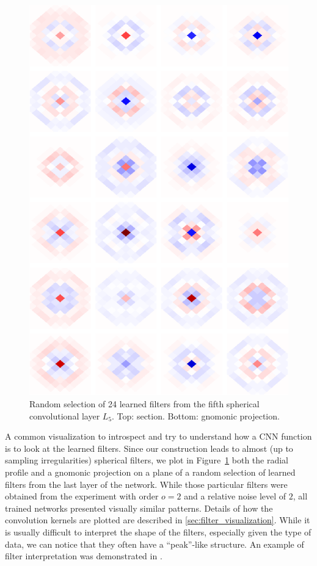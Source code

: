 \documentclass[final,twocolumn,3p,times,sort&compress]{elsarticle}
\newcommand{\figref}[1]{Figure~\ref{fig:#1}}
\newcommand{\1}{\b{1}}              %
\newcommand{\0}{\b{0}}              %
\begin{document}
\begin{figure}
	\includegraphics[width=\linewidth]{gnonomic_filter_last}
	\caption{Random selection of 24 learned filters from the fifth spherical convolutional layer $L_5$. Top: section. Bottom: gnomonic projection.}
	\label{fig:learned_filter}
\end{figure}

A common visualization to introspect and try to understand how a CNN function is to look at the learned filters.
Since our construction leads to almost (up to sampling irregularities) spherical filters, we plot in \figref{learned_filter} both the radial profile and a gnomonic projection on a plane of a random selection of learned filters from the last layer of the network.
While those particular filters were obtained from the experiment with order $o=2$ and a relative noise level of $2$, all trained networks presented visually similar patterns.
Details of how the convolution kernels are plotted are described in \ref{sec:filter_visualization}.
While it is usually difficult to interpret the shape of the filters, especially given the type of data, we can notice that they often have a ``peak''-like structure.
An example of filter interpretation was demonstrated in \citep{Ribli2018learningfrom}.
\end{document}
